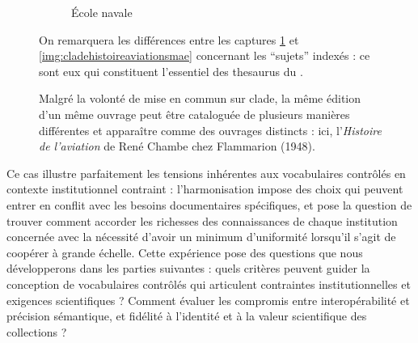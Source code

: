 \begin{figure}[htbp]
\begin{subfigure}{0.7\textwidth}
		\caption{École navale}
		\label{img:cladehistoireaviationnavale}
	\end{subfigure}
	\caption[Différences de catalogage entre les \bibmusee sur \ac{clade}]{Malgré la volonté de mise en commun sur \ac{clade}, la même édition d'un même ouvrage peut être cataloguée de plusieurs manières différentes et apparaître comme des ouvrages distincts : ici, l'\textit{Histoire de l'aviation} de René Chambe chez Flammarion (1948).} On remarquera les différences entre les captures \ref{img:cladehistoireaviationnavale} et \ref{img:cladehistoireaviationsmae} concernant les \enquote{sujets} indexés : ce sont eux qui constituent l'essentiel des \gls{thesaurus} du \mae.
	\label{fig:clade_histoaviation}
\end{figure}

Ce cas illustre parfaitement les tensions inhérentes aux vocabulaires contrôlés en contexte institutionnel contraint : l'harmonisation impose des choix qui peuvent entrer en conflit avec les besoins documentaires spécifiques, et pose la question de trouver comment accorder les richesses des connaissances de chaque institution concernée avec la nécessité d'avoir un minimum d'uniformité lorsqu'il s'agit de coopérer à grande échelle. Cette expérience pose des questions que nous développerons dans les parties suivantes : quels critères peuvent guider la conception de vocabulaires contrôlés qui articulent contraintes institutionnelles et exigences scientifiques ? Comment évaluer les compromis entre interopérabilité et précision sémantique, et fidélité à l'identité et à la valeur scientifique des collections ?